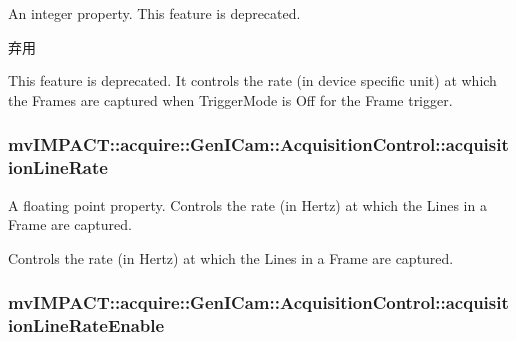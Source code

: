 An integer property. This feature is deprecated. 

\begin{DoxyRefDesc}{弃用}
\item[\hyperlink{deprecated__deprecated000043}{弃用}]This feature is deprecated. It controls the rate (in device specific unit) at which the Frames are captured when Trigger\+Mode is Off for the Frame trigger. \end{DoxyRefDesc}
\hypertarget{classmv_i_m_p_a_c_t_1_1acquire_1_1_gen_i_cam_1_1_acquisition_control_aebb38e835c99a65cb205cfe160b03ccd}{
\subsubsection[{acquisition\+Line\+Rate}]{ mv\+I\+M\+P\+A\+C\+T\+::acquire\+::\+Gen\+I\+Cam\+::\+Acquisition\+Control\+::acquisition\+Line\+Rate}}\label{classmv_i_m_p_a_c_t_1_1acquire_1_1_gen_i_cam_1_1_acquisition_control_aebb38e835c99a65cb205cfe160b03ccd}


A floating point property. Controls the rate (in Hertz) at which the Lines in a Frame are captured. 

Controls the rate (in Hertz) at which the Lines in a Frame are captured. \hypertarget{classmv_i_m_p_a_c_t_1_1acquire_1_1_gen_i_cam_1_1_acquisition_control_a474bf5cf15c9b733b1c1e73cc520885a}{
\subsubsection[{acquisition\+Line\+Rate\+Enable}]{ mv\+I\+M\+P\+A\+C\+T\+::acquire\+::\+Gen\+I\+Cam\+::\+Acquisition\+Control\+::acquisition\+Line\+Rate\+Enable}}\label{classmv_i_m_p_a_c_t_1_1acquire_1_1_gen_i_cam_1_1_acquisition_control_a474bf5cf15c9b733b1c1e73cc520885a}


